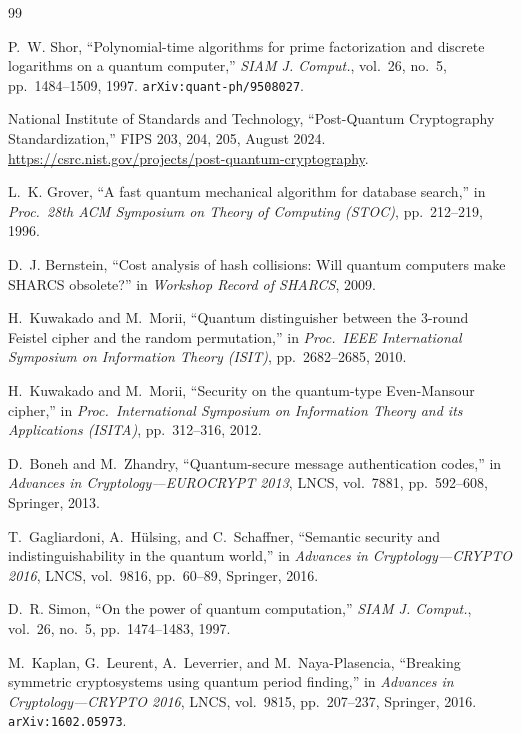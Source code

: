 \documentclass[11pt,a4paper]{article}
\begin{document}
\begin{thebibliography}{99}

P.~W. Shor,
``Polynomial-time algorithms for prime factorization and discrete
logarithms on a quantum computer,''
\textit{SIAM J. Comput.}, vol.~26, no.~5, pp.~1484--1509, 1997.
\texttt{arXiv:quant-ph/9508027}.

National Institute of Standards and Technology,
``Post-Quantum Cryptography Standardization,''
FIPS 203, 204, 205, August 2024.
\url{https://csrc.nist.gov/projects/post-quantum-cryptography}.

L.~K. Grover,
``A fast quantum mechanical algorithm for database search,''
in \textit{Proc.\ 28th ACM Symposium on Theory of Computing (STOC)},
pp.~212--219, 1996.

D.~J. Bernstein,
``Cost analysis of hash collisions: Will quantum computers make
SHARCS obsolete?''
in \textit{Workshop Record of SHARCS}, 2009.

H.~Kuwakado and M.~Morii,
``Quantum distinguisher between the 3-round Feistel cipher and the
random permutation,''
in \textit{Proc.\ IEEE International Symposium on Information Theory
(ISIT)}, pp.~2682--2685, 2010.

H.~Kuwakado and M.~Morii,
``Security on the quantum-type Even-Mansour cipher,''
in \textit{Proc.\ International Symposium on Information Theory and
its Applications (ISITA)}, pp.~312--316, 2012.

D.~Boneh and M.~Zhandry,
``Quantum-secure message authentication codes,''
in \textit{Advances in Cryptology---EUROCRYPT 2013},
LNCS, vol.~7881, pp.~592--608, Springer, 2013.

T.~Gagliardoni, A.~H\"{u}lsing, and C.~Schaffner,
``Semantic security and indistinguishability in the quantum world,''
in \textit{Advances in Cryptology---CRYPTO 2016},
LNCS, vol.~9816, pp.~60--89, Springer, 2016.

D.~R. Simon,
``On the power of quantum computation,''
\textit{SIAM J. Comput.}, vol.~26, no.~5, pp.~1474--1483, 1997.

M.~Kaplan, G.~Leurent, A.~Leverrier, and M.~Naya-Plasencia,
``Breaking symmetric cryptosystems using quantum period finding,''
in \textit{Advances in Cryptology---CRYPTO 2016},
LNCS, vol.~9815, pp.~207--237, Springer, 2016.
\texttt{arXiv:1602.05973}.


\end{thebibliography}
\end{document}
